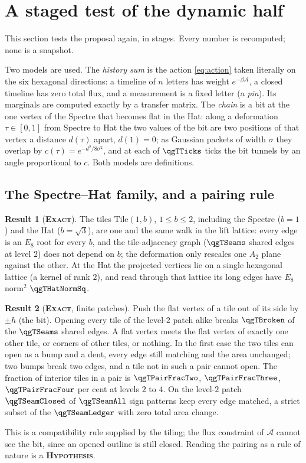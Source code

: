 \documentclass[11pt]{article}
\newcommand{\exact}{\textbf{\textsc{Exact}}}
\newcommand{\hypo}{\textbf{\textsc{Hypothesis}}}
\theoremstyle{definition}
\newtheorem{result}{Result}
\begin{document}
\section{A staged test of the dynamic half}\label{sec:staged}
This section tests the proposal again, in stages. Every number is recomputed; none is a snapshot.

Two models are used. The \emph{history sum} is the action \eqref{eq:action} taken literally on the six hexagonal directions: a timeline of $n$ letters has weight $e^{-\beta\mathcal{A}}$, a closed timeline has zero total flux, and a measurement is a fixed letter (a \emph{pin}). Its marginals are computed exactly by a transfer matrix. The \emph{chain} is a bit at the one vertex of the Spectre that becomes flat in the Hat: along a deformation $\tau\in[0,1]$ from Spectre to Hat the two values of the bit are two positions of that vertex a distance $d(\tau)$ apart, $d(1)=0$; as Gaussian packets of width $\sigma$ they overlap by $c(\tau)=e^{-d^2/8\sigma^2}$, and at each of $\qgTTicks$ ticks the bit tunnels by an angle proportional to $c$. Both models are definitions.

\subsection{The Spectre--Hat family, and a pairing rule}\label{sec:staged-lattice}
\begin{result}[\exact]\label{res:family}
The tiles $\mathrm{Tile}(1,b)$, $1\le b\le2$, including the Spectre ($b=1$) and the Hat ($b=\sqrt3$), are one and the same walk in the lift lattice: every edge is an $E_8$ root for every $b$, and the tile-adjacency graph ($\qgTSeams$ shared edges at level $2$) does not depend on $b$; the deformation only rescales one $A_2$ plane against the other. At the Hat the projected vertices lie on a single hexagonal lattice (a kernel of rank $2$), and read through that lattice its long edges have $E_8$ norm$^2$ $\qgTHatNormSq$.
\end{result}
\begin{result}[\exact, finite patches]\label{res:pairs}
Push the flat vertex of a tile out of its side by $\pm h$ (the bit). Opening every tile of the level-$2$ patch alike breaks $\qgTBroken$ of the $\qgTSeams$ shared edges. A flat vertex meets the flat vertex of exactly one other tile, or corners of other tiles, or nothing. In the first case the two tiles can open as a bump and a dent, every edge still matching and the area unchanged; two bumps break two edges, and a tile not in such a pair cannot open. The fraction of interior tiles in a pair is $\qgTPairFracTwo$, $\qgTPairFracThree$, $\qgTPairFracFour$ per cent at levels $2$ to $4$. On the level-$2$ patch $\qgTSeamClosed$ of $\qgTSeamAll$ sign patterns keep every edge matched, a strict subset of the $\qgTSeamLedger$ with zero total area change.
\end{result}
This is a compatibility rule supplied by the tiling; the flux constraint of $\mathcal{A}$ cannot see the bit, since an opened outline is still closed. Reading the pairing as a rule of nature is a \hypo.
\end{document}
